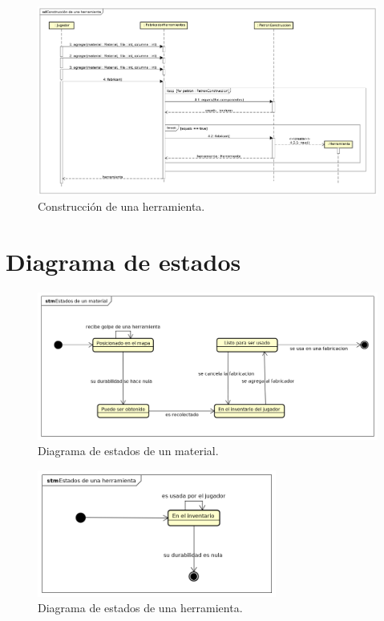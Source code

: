 \documentclass[titlepage,a4paper]{article}
\begin{document}
\begin{figure}[H]
	\centering
	\includegraphics[width=\textwidth]{Diagramas/ConstruccionHerramienta.png}
	\caption{\label{fig:fabricacion}Construcción de una herramienta.}
\end{figure}


\section{Diagrama de estados}\label{sec:diagramadeestados}
\begin{figure}[H]
	\centering
	\includegraphics[width=\textwidth]{Diagramas/EstadosMaterial.png}
	\caption{\label{fig:estadosmaterial}Diagrama de estados de un material.}
\end{figure}

\begin{figure}[H]
	\centering
	\includegraphics[width=0.7\textwidth]{Diagramas/EstadosHerramienta.png}
	\caption{\label{fig:estadosherramienta}Diagrama de estados de una herramienta.}
\end{figure}
\end{document}
